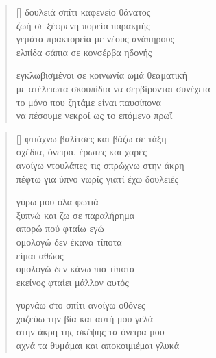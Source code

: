 \documentclass[12pt]{article}
\begin{document}
\newpage

\settowidth{\versewidth}{γεμάτα πρακτορεία με νέους ανάπηρους}
\begin{verse}[\versewidth]
  δουλειά σπίτι καφενείο θάνατος \\
  ζωή σε ξέφρενη πορεία παρακμής \\
  γεμάτα πρακτορεία με νέους ανάπηρους \\
  ελπίδα σάπια σε κονσέρβα ηδονής

  εγκλωβισμένοι σε κοινωνία ωμά θεαματική \\
  με ατέλειωτα σκουπίδια να σερβίρονται συνέχεια \\
  το μόνο που ζητάμε είναι παυσίπονα \\
  να πέσουμε νεκροί ως το επόμενο πρωϊ
\end{verse}

\newpage

\settowidth{\versewidth}{σχέδια, όνειρα, έρωτες και χαρές}
\begin{verse}[\versewidth]
  φτιάχνω βαλίτσες και βάζω σε τάξη \\
  σχέδια, όνειρα, έρωτες και χαρές \\
  ανοίγω ντουλάπες τις σπρώχνω στην άκρη \\
  πέφτω για ύπνο νωρίς γιατί έχω δουλειές

  γύρω μου όλα φωτιά \\
  ξυπνώ και ζω σε παραλήρημα \\
  απορώ πού φταίω εγώ \\
  ομολογώ δεν έκανα τίποτα \\
  είμαι αθώος \\
  ομολογώ δεν κάνω πια τίποτα \\
  εκείνος φταίει μάλλον αυτός

  γυρνάω στο σπίτι ανοίγω οθόνες \\
  χαζεύω την βία και αυτή μου γελά \\
  στην άκρη της σκέψης τα όνειρα μου \\
  αχνά τα θυμάμαι και αποκοιμιέμαι γλυκά
\end{verse}

\newpage
\end{document}

